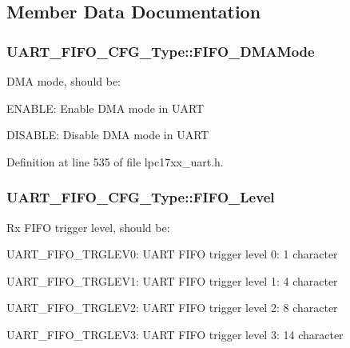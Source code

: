 \subsection{Member Data Documentation}
\subsubsection[{\texorpdfstring{F\+I\+F\+O\+\_\+\+D\+M\+A\+Mode}{FIFO_DMAMode}}]{ U\+A\+R\+T\+\_\+\+F\+I\+F\+O\+\_\+\+C\+F\+G\+\_\+\+Type\+::\+F\+I\+F\+O\+\_\+\+D\+M\+A\+Mode}\hypertarget{struct_u_a_r_t___f_i_f_o___c_f_g___type_ac2290ece03c3cf70067e1043cb6dad9e}{}\label{struct_u_a_r_t___f_i_f_o___c_f_g___type_ac2290ece03c3cf70067e1043cb6dad9e}
D\+MA mode, should be\+:
\begin{DoxyItemize}
\item E\+N\+A\+B\+LE\+: Enable D\+MA mode in U\+A\+RT
\item D\+I\+S\+A\+B\+LE\+: Disable D\+MA mode in U\+A\+RT 
\end{DoxyItemize}

Definition at line 535 of file lpc17xx\+\_\+uart.\+h.

\subsubsection[{\texorpdfstring{F\+I\+F\+O\+\_\+\+Level}{FIFO_Level}}]{ U\+A\+R\+T\+\_\+\+F\+I\+F\+O\+\_\+\+C\+F\+G\+\_\+\+Type\+::\+F\+I\+F\+O\+\_\+\+Level}\hypertarget{struct_u_a_r_t___f_i_f_o___c_f_g___type_afe71db9c3088c092ae6a93ddba4e967d}{}\label{struct_u_a_r_t___f_i_f_o___c_f_g___type_afe71db9c3088c092ae6a93ddba4e967d}
Rx F\+I\+FO trigger level, should be\+:
\begin{DoxyItemize}
\item U\+A\+R\+T\+\_\+\+F\+I\+F\+O\+\_\+\+T\+R\+G\+L\+E\+V0\+: U\+A\+RT F\+I\+FO trigger level 0\+: 1 character
\item U\+A\+R\+T\+\_\+\+F\+I\+F\+O\+\_\+\+T\+R\+G\+L\+E\+V1\+: U\+A\+RT F\+I\+FO trigger level 1\+: 4 character
\item U\+A\+R\+T\+\_\+\+F\+I\+F\+O\+\_\+\+T\+R\+G\+L\+E\+V2\+: U\+A\+RT F\+I\+FO trigger level 2\+: 8 character
\item U\+A\+R\+T\+\_\+\+F\+I\+F\+O\+\_\+\+T\+R\+G\+L\+E\+V3\+: U\+A\+RT F\+I\+FO trigger level 3\+: 14 character 
\end{DoxyItemize}

